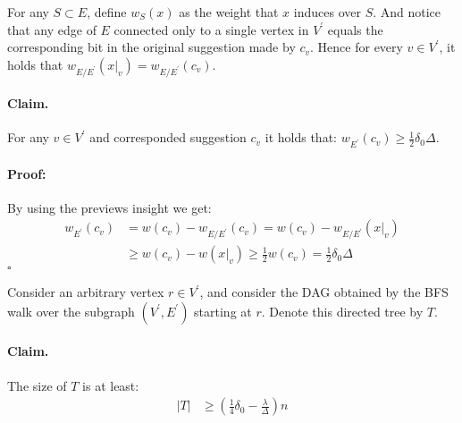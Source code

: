 \documentclass{article}
\begin{document}
\begin{multicols*}{2}
  For any $S \subset E$, define $w_{S}\left( x \right)$ as the weight that $x$ induces over $S$. And notice that any edge of $E$ connected only to a single vertex in $V^\prime$ equals the corresponding bit in the original suggestion made by $c_{v}$. Hence for every $v\in V^\prime$, it holds that $w_{E / E^\prime}\left(x|_{v}\right) = w_{E / E^\prime}\left(c_{v}\right)$. 

%
  \paragraph{Claim.} For any $v \in V^\prime$ and corresponded suggestion $c_{v}$ it holds that: $w_{E^\prime}\left( c_{v} \right) \ge \frac{1}{2}\delta_{0}\Delta$. 
  \paragraph{Proof:}By using the previews insight we get: \begin{equation*}
    \begin{split}
      w_{E^\prime}\left( c_{v} \right) &= w\left( c_{v} \right) - w_{E / E^\prime}\left( c_{v} \right) =  w\left( c_{v} \right) - w_{E / E^\prime}\left( x|_{v} \right) \\ 
      & \ge  w\left( c_{v} \right) - w\left( x|_{v} \right) \ge \frac{1}{2}w\left( c_{v} \right) = \frac{1}{2}\delta_{0}\Delta 
    \end{split}
  \end{equation*}
  $\square$

  Consider an arbitrary vertex $r \in V^\prime$, and consider the DAG obtained by the BFS walk over the subgraph $\left(V^\prime, E^\prime \right)$ starting at $r$. Denote this directed tree by $T$.


  \paragraph{Claim.} The size of $T$ is at least:
  \begin{equation*}
    \begin{split}
      |T| & \ge \left( \frac{1}{4}\delta_{0} - \frac{\lambda}{\Delta} \right)n 
    \end{split}
  \end{equation*}

\end{multicols*}
\end{document}
